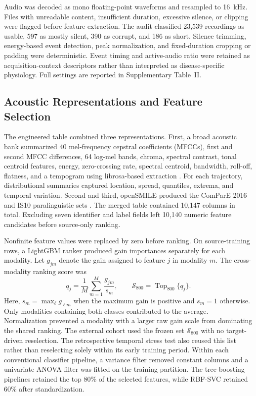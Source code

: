 \documentclass[journal]{IEEEtran}
\begin{document}
Audio was decoded as mono floating-point waveforms and resampled to 16~kHz. Files with unreadable content, insufficient duration, excessive silence, or clipping were flagged before feature extraction. The audit classified 23,539 recordings as usable, 597 as mostly silent, 390 as corrupt, and 186 as short. Silence trimming, energy-based event detection, peak normalization, and fixed-duration cropping or padding were deterministic. Event timing and active-audio ratio were retained as acquisition-context descriptors rather than interpreted as disease-specific physiology. Full settings are reported in Supplementary Table~II.

\subsection{Acoustic Representations and Feature Selection}

The engineered table combined three representations. First, a broad acoustic bank summarized 40 mel-frequency cepstral coefficients (MFCCs), first and second MFCC differences, 64 log-mel bands, chroma, spectral contrast, tonal centroid features, energy, zero-crossing rate, spectral centroid, bandwidth, roll-off, flatness, and a tempogram using librosa-based extraction \cite{mcfee2015librosa}. For each trajectory, distributional summaries captured location, spread, quantiles, extrema, and temporal variation. Second and third, openSMILE produced the ComParE 2016 and IS10 paralinguistic sets \cite{eyben2010opensmile,schuller2010is10,schuller2016compare}. The merged table contained 10,147 columns in total. Excluding seven identifier and label fields left 10,140 numeric feature candidates before source-only ranking.

Nonfinite feature values were replaced by zero before ranking. On source-training rows, a LightGBM ranker produced gain importances separately for each modality. Let $g_{jm}$ denote the gain assigned to feature $j$ in modality $m$. The cross-modality ranking score was
\begin{equation}
    q_j=\frac{1}{M}\sum_{m=1}^{M}
    \frac{g_{jm}}{s_m}, \qquad
    \mathcal{S}_{800}=\operatorname{Top}_{800}\{q_j\}.
\end{equation}
Here, $s_m=\max_{\ell}g_{\ell m}$ when the maximum gain is positive and $s_m=1$ otherwise. Only modalities containing both classes contributed to the average. Normalization prevented a modality with a larger raw gain scale from dominating the shared ranking. The external cohort used the frozen set $\mathcal{S}_{800}$ with no target-driven reselection. The retrospective temporal stress test also reused this list rather than reselecting solely within its early training period. Within each conventional classifier pipeline, a variance filter removed constant columns and a univariate ANOVA filter was fitted on the training partition. The tree-boosting pipelines retained the top 80\% of the selected features, while RBF-SVC retained 60\% after standardization.
\end{document}
